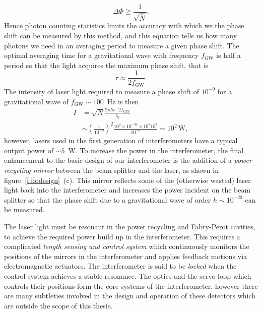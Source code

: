 \begin{equation}
\Delta \Phi \ge \frac{1}{\sqrt{\bar{N}}}.
\end{equation}
Hence photon counting statistics limits the accuracy with which we the phase
shift can be measured by this method, and this equation tells us how many
photons we need in an averaging period to measure a given phase shift. The
optimal averaging time for a gravitational wave with frequency $f_\mathrm{GW}$
is half a period so that the light acquires the maximum phase shift, that is
\begin{equation}
\tau \approx \frac{1}{2 f_\mathrm{GW}}.
\end{equation}
The intensity of laser light required to measure a phase shift of $10^{-9}$
for a gravitational wave of $f_\mathrm{GW} \sim 100$~Hz is then
\begin{equation}
\begin{split}
I &= \sqrt{N} \frac{2 \pi \hbar c \cdot 2f_\mathrm{GW}}{\lambda_l} \\
&\sim \left(\frac{1}{10^{-9}}\right)^2 
\frac{10^2 \times 10^{-34} \times 10^{8} 10^2 } { 10^{-6} } \sim 10^2\,
\mathrm{W},
\end{split}
\end{equation}
however, lasers used in the first generation of interferometers have a typical
output power of $\sim 5$~W. To increase the power in the interferometer, the
final enhancement to the basic design of our interferometer is the addition of a
\emph{power recycling mirror} between the beam splitter and the laser, as
shown in figure~\ref{f:ifodesign}~(c). This mirror reflects some of the
(otherwise wasted) laser light back into the interferometer and increases the
power incident on the beam splitter so that the phase shift due to a
gravitational wave of order $h \sim 10^{-23}$ can be measured.

The laser light must be resonant in the power recycling and Fabry-Perot
cavities, to achieve the required power build up in the interferometer. This
requires a complicated \emph{length sensing and control
system}\cite{Fritschel:2001} which continuously monitors the positions of the
mirrors in the interferometer and applies feedback motions via electromagnetic
actuators. The interferometer is said to be \emph{locked} when the control
system achieves a stable resonance. The optics and the servo loop which
controls their positions form the core systems of the interferometer, however
there are many subtleties involved in the design and operation of these
detectors which are outside the scope of this thesis.

